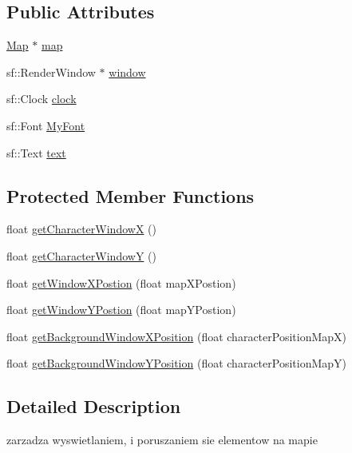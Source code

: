 \subsection*{Public Attributes}
\begin{DoxyCompactItemize}
\item 
\hyperlink{class_map}{Map} $\ast$ \hyperlink{class_display_map_manager_aefa663d75781e47edfc5629e3652ead8}{map}
\item 
sf\+::\+Render\+Window $\ast$ \hyperlink{class_display_map_manager_a880f01a1287f35cc4852c2e5d58ecd24}{window}
\item 
sf\+::\+Clock \hyperlink{class_display_map_manager_ad04d2e96cd8ba8f1cbcf3425bd28cfc5}{clock}
\item 
sf\+::\+Font \hyperlink{class_display_map_manager_af1ea34885ea77010e9a99b6a49da5e58}{My\+Font}
\item 
sf\+::\+Text \hyperlink{class_display_map_manager_ad9a89d13fbf1ac95fbb058b565bb4d2f}{text}
\end{DoxyCompactItemize}
\subsection*{Protected Member Functions}
\begin{DoxyCompactItemize}
\item 
float \hyperlink{class_display_map_manager_a9f3a6841688b7e4932ca1269588d4504}{get\+Character\+WindowX} ()
\item 
float \hyperlink{class_display_map_manager_a4a17bf69eb158d10c6af0b5467735d60}{get\+Character\+WindowY} ()
\item 
float \hyperlink{class_display_map_manager_af26ef96ab1e1e2c33e9160a8a66263f7}{get\+Window\+X\+Postion} (float map\+X\+Postion)
\item 
float \hyperlink{class_display_map_manager_ad850ee0bd93bab3cf376ce343eabfff0}{get\+Window\+Y\+Postion} (float map\+Y\+Postion)
\item 
float \hyperlink{class_display_map_manager_a12847fea83dc76f47255605f7de3d020}{get\+Background\+Window\+X\+Position} (float character\+Position\+MapX)
\item 
float \hyperlink{class_display_map_manager_a7326948a0f1ef16c89a27f5bde09192b}{get\+Background\+Window\+Y\+Position} (float character\+Position\+MapY)
\end{DoxyCompactItemize}


\subsection{Detailed Description}
zarzadza wyswietlaniem, i poruszaniem sie elementow na mapie 

